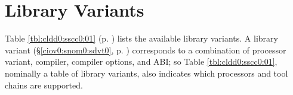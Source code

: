 %
%
%


\section{Library Variants}
\label{cldd0:sscc0}

Table \ref{tbl:cldd0:sscc0:01} (p.  
\pageref{tbl:cldd0:sscc0:01}) lists the available library 
variants.  A library variant (\S{}\ref{ciov0:snom0:sdvt0}, 
p.  \pageref{ciov0:snom0:sdvt0}) corresponds to a 
combination of processor variant, compiler, compiler 
options, and ABI; so Table \ref{tbl:cldd0:sscc0:01}, 
nominally a table of library variants, also indicates which 
processors and tool chains are supported.  

